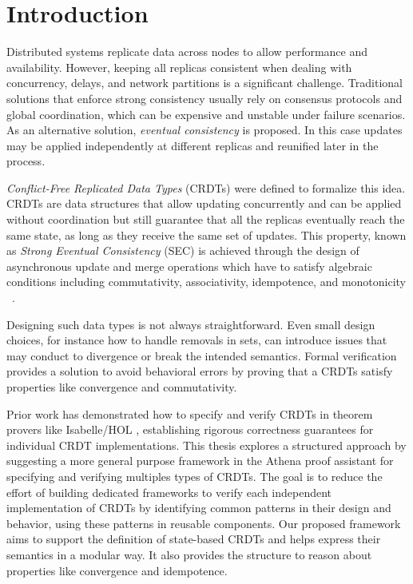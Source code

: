 


\chapter{Introduction}

Distributed systems replicate data across nodes to allow performance and availability. However, keeping all replicas consistent when dealing with concurrency, delays, and network partitions is a significant challenge. Traditional solutions that enforce strong consistency usually rely on consensus protocols and global coordination, which can be expensive and unstable under failure scenarios. As an alternative solution, \emph{eventual consistency} is proposed. In this case updates may be applied independently at different replicas and reunified later in the process.

\emph{Conflict-Free Replicated Data Types} (CRDTs) were defined to formalize this idea. CRDTs are data structures that allow updating concurrently and can be applied without coordination but still guarantee that all the replicas eventually reach the same state, as long as they receive the same set of updates. This property, known as \emph{Strong Eventual Consistency} (SEC) is achieved through the design of asynchronous update and merge operations which have to satisfy algebraic conditions including commutativity, associativity, idempotence, and monotonicity ~\cite{shapiro2011conflict}.

Designing such data types is not always straightforward. Even small design choices, for instance how to handle removals in sets, can introduce issues that may conduct to divergence or break the intended semantics. Formal verification provides a solution to avoid behavioral errors by proving that a CRDTs satisfy properties like convergence and commutativity. 

Prior work has demonstrated how to specify and verify CRDTs in theorem provers like Isabelle/HOL \cite{zeller2014formal}, establishing rigorous correctness guarantees for individual CRDT implementations. This thesis explores a structured approach by suggesting a more general purpose framework in the Athena proof assistant for specifying and verifying multiples types of CRDTs. The goal is to reduce the effort of building dedicated frameworks to verify each independent implementation of CRDTs by identifying common patterns in their design and behavior, using these patterns in reusable components. Our proposed framework aims to support the definition of state-based CRDTs and helps express their semantics in a modular way. It also provides the structure to reason about properties like convergence and idempotence.

